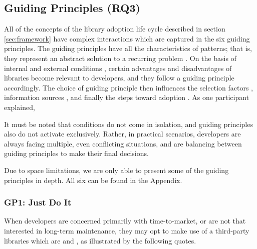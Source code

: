 \subsection{Guiding Principles (RQ3)}
\label{sec:gp}

All of the concepts of the library adoption life cycle described in section \ref{sec:framework} have complex interactions which are captured in the six guiding principles.  The guiding principles have all the characteristics of patterns; that is, they represent an abstract solution to a recurring problem \cite{riehle:2021:pattern}. On the basis of internal and external conditions , certain advantages and disadvantages of libraries become relevant to developers, and they follow a guiding principle accordingly. The choice of guiding principle then influences the selection factors , information sources , and finally the steps toward adoption . As one participant explained,

It must be noted that conditions do not come in isolation, and guiding principles also do not activate exclusively. Rather, in practical scenarios, developers are always facing multiple, even conflicting situations, and are balancing between guiding principles to make their final decisions.

Due to space limitations, we are only able to present some of the guiding principles in depth. All six can be found in the Appendix.


\subsubsection{GP1: Just Do It}
When developers are concerned primarily with time-to-market, or are not that interested in long-term maintenance, they may opt to make use of a third-party libraries which are  and , as illustrated by the following quotes. 
%  




